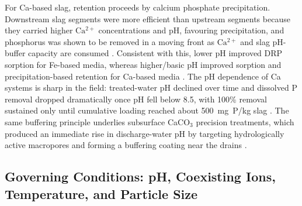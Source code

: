 \documentclass[11pt]{article}
\begin{document}
For Ca-based slag, retention proceeds by calcium phosphate precipitation.
Downstream slag segments were more efficient than upstream segments because they
carried higher $\mathrm{Ca^{2+}}$ concentrations and pH, favouring precipitation,
and phosphorus was shown to be removed in a moving front as $\mathrm{Ca^{2+}}$ and
slag pH-buffer capacity are consumed \parencite{Wang2020d}. Consistent with this,
lower pH improved DRP sorption for Fe-based media, whereas higher/basic pH
improved sorption and precipitation-based retention for Ca-based media
\parencite{Mendes2022}. The pH dependence of Ca systems is sharp in the field:
treated-water pH declined over time and dissolved P removal dropped dramatically
once pH fell below 8.5, with 100\% removal sustained only until cumulative loading
reached about 500~mg~P/kg slag \parencite{Penn2020}. The same buffering principle
underlies subsurface CaCO$_3$ precision treatments, which produced an immediate
rise in discharge-water pH by targeting hydrologically active macropores and
forming a buffering coating near the drains \parencite{Dalhem2019}.

\subsection{Governing Conditions: pH, Coexisting Ions, Temperature, and Particle Size}
\end{document}
